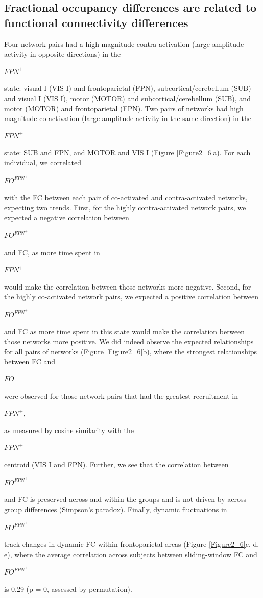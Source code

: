 \documentclass[phd,tocprelim]{cornell}
\begin{document}
    \subsection*{Fractional occupancy differences are related to functional connectivity differences}
    Four network pairs had a high magnitude contra-activation (large amplitude activity in opposite directions) in the \begin{Large}$FPN^+$\end{Large} state: visual I (VIS I) and frontoparietal (FPN), subcortical/cerebellum (SUB) and visual I (VIS I), motor (MOTOR) and subcortical/cerebellum (SUB), and motor (MOTOR) and frontoparietal (FPN). Two pairs of networks had high magnitude co-activation (large amplitude activity in the same direction) in the \begin{Large}$FPN^+$\end{Large} state: SUB and FPN, and MOTOR and VIS I (Figure \ref{Figure2_6}a). For each individual, we correlated \begin{Large}$FO^{FPN^+}$\end{Large} with the FC between each pair of co-activated and contra-activated networks, expecting two trends. First, for the highly contra-activated network pairs, we expected a negative correlation between \begin{Large}$FO^{FPN^+}$\end{Large} and FC, as more time spent in \begin{Large}$FPN^+$\end{Large} would make the correlation between those networks more negative. Second, for the highly co-activated network pairs, we expected a positive correlation between \begin{Large}$FO^{FPN^+}$\end{Large} and FC as more time spent in this state would make the correlation between those networks more positive. We did indeed observe the expected relationships for all pairs of networks (Figure \ref{Figure2_6}b), where the strongest relationships between FC and \begin{Large}$FO$\end{Large} were observed for those network pairs that had the greatest recruitment in \begin{Large}$FPN^+$,\end{Large} as measured by cosine similarity with the \begin{Large}$FPN^+$\end{Large} centroid (VIS I and FPN). Further, we see that the correlation between \begin{Large}$FO^{FPN^+}$\end{Large} and FC is preserved across and within the groups and is not driven by across-group differences (Simpson's paradox).
    Finally, dynamic fluctuations in  \begin{Large}$FO^{FPN^+}$ \end{Large} track changes in dynamic FC within frontoparietal areas (Figure \ref{Figure2_6}c, d, e), where the average correlation across subjects between sliding-window FC and  \begin{Large}$FO^{FPN^+}$ \end{Large} is 0.29 (p = 0, assessed by permutation).
\end{document}
